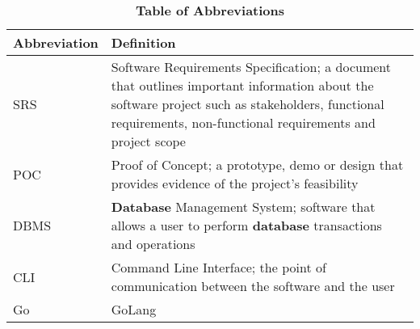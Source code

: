 \documentclass[12pt, titlepage]{article}
\begin{document}
\begin{table}[H]
\caption{\textbf{Table of Abbreviations}} \label{Table}

\begin{tabularx}{\textwidth}{p{3cm}X}
\toprule
\textbf{Abbreviation} & \textbf{Definition} \\
\midrule
SRS & Software Requirements Specification; a document that outlines important information about the software project such as stakeholders, functional requirements, non-functional requirements and project scope \\
POC & Proof of Concept; a prototype, demo or design that provides evidence of the project's feasibility \\
DBMS & \textbf{Database} Management System; software that allows a user to perform \textbf{database} transactions and operations\\
CLI & Command Line Interface; the point of communication between the software and the user \\
Go & GoLang \\
\bottomrule
\end{tabularx}

\end{table}
\end{document}
